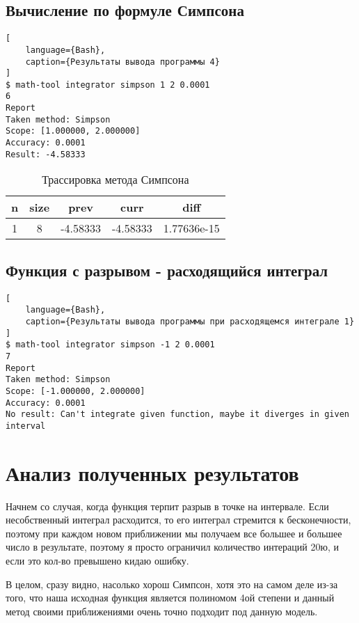 \documentclass{article}
\begin{document}
\subsection{Вычисление по формуле Симпсона}

\begin{lstlisting}[
    language={Bash},
    caption={Результаты вывода программы 4}
]
$ math-tool integrator simpson 1 2 0.0001
6
Report
Taken method: Simpson
Scope: [1.000000, 2.000000]
Accuracy: 0.0001
Result: -4.58333
\end{lstlisting}

\begin{table}[h]
    \centering
    \caption{Трассировка метода Симпсона}
    \begin{tabular}{|c|c|c|c|c|}
        \hline
        n & size & prev     & curr     & diff        \\ \hline
        1 & 8    & -4.58333 & -4.58333 & 1.77636e-15 \\ \hline
    \end{tabular}
\end{table}

\subsection{Функция с разрывом - расходящийся интеграл}

\begin{lstlisting}[
    language={Bash},
    caption={Результаты вывода программы при расходящемся интеграле 1}
]
$ math-tool integrator simpson -1 2 0.0001
7
Report
Taken method: Simpson
Scope: [-1.000000, 2.000000]
Accuracy: 0.0001
No result: Can't integrate given function, maybe it diverges in given interval
\end{lstlisting}

\section{Анализ полученных результатов}


Начнем со случая, когда функция терпит разрыв в
точке на интервале. Если несобственный интеграл
расходится, то его интеграл стремится к бесконечности,
поэтому при каждом новом приближении мы получаем все большее
и большее число в результате, поэтому я просто
ограничил количество интераций 20ю, и если это кол-во
превышено кидаю ошибку.

В целом, сразу видно, насолько хорош Симпсон, хотя
это на самом деле из-за того, что наша исходная функция
является полиномом 4ой степени и данный метод своими
приближениями очень точно подходит под данную модель.
\end{document}
